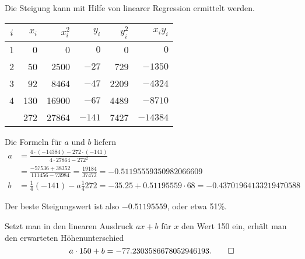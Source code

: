 \begin{loesung}
Die Steigung kann mit Hilfe von linearer Regression ermittelt werden.
\begin{center}
\begin{tabular}{|c|rr|rr|r|}
\hline
$i$&$x_i$&$x_i^2$&$y_i$&$y_i^2$&$x_iy_i$\\
\hline
1&  0&    0&$   0$&   0&$    0$\\
2& 50& 2500&$ -27$& 729&$ -1350$\\
3& 92& 8464&$ -47$&2209&$ -4324$\\
4&130&16900&$ -67$&4489&$ -8710$\\
\hline
 &272&27864&$-141$&7427&$-14384$\\
\hline
\end{tabular}
\end{center}
Die Formeln für $a$ und $b$ liefern
\begin{align*}
a
&=\frac{4\cdot(-14384)-272\cdot (-141)}{4\cdot 27864 - 272^2}
\\
&=
\frac{-57536+38352}{111456-73984}
=
\frac{19184}{37472}=-0.51195559350982066609
\\
b
&=
\frac14(-141)-a\frac14272
=-35.25 + 0.51195559\cdot 68=-0.43701964133219470588
\end{align*}
\begin{teilaufgaben}
\item Der beste Steigungswert ist also $-0.51195559$, oder etwa 51\%.
\item Setzt man in den linearen Ausdruck $ax+b$ für $x$ den Wert
150 ein, erhält man den erwarteten Höhenunterschied
\[
a\cdot 150 + b= 
-77.2303586678052946193.
\qedhere
\]
\end{teilaufgaben}
\end{loesung}

